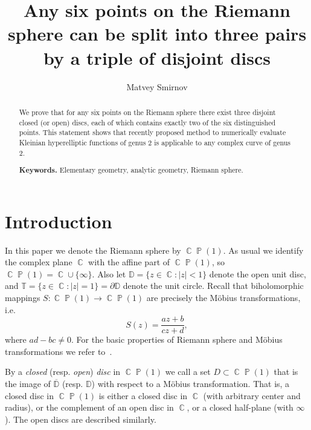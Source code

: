 \documentclass{amsart}
\numberwithin{equation}{section}
\theoremstyle{definition}
\theoremstyle{remark}
\DeclareMathOperator{\CC}{\mathbb C}
\DeclareMathOperator{\PP}{\mathbb P}
\begin{document}
	\title[Six points can be split by a triple of disjoint discs]{Any six points on the Riemann sphere can be split into three pairs by a triple of disjoint discs}
	
	\author{Matvey Smirnov}
	\address{119991 Russia, Moscow GSP-1, ul. Gubkina 8,
		Institute for Numerical Mathematics,
		Russian Academy of Sciences}
	
	
	\begin{abstract}
		We prove that for any six points on the Riemann sphere there exist three disjoint closed (or open) discs, each of which contains exactly two of the six distinguished points. This statement shows that recently proposed method to numerically evaluate Kleinian hyperelliptic functions of genus 2 is applicable to any complex curve of genus 2.
		
		\smallskip
		\noindent \textbf{Keywords.} Elementary geometry, analytic geometry, Riemann sphere.
	\end{abstract}
	\maketitle
	
	\section{Introduction}
	
	In this paper we denote the Riemann sphere by $\CC\PP(1)$. As usual we identify the complex plane $\CC$ with the affine part of $\CC\PP(1)$, so $\CC\PP(1) = \CC\cup \{\infty\}$. Also let $\mathbb D = \{z \in \CC: |z| < 1\}$ denote the open unit disc, and $\mathbb T = \{z \in \CC: |z| = 1\} = \partial \mathbb D$ denote the unit circle. Recall that biholomorphic mappings $S: \CC\PP(1) \to \CC\PP(1)$ are precisely the M\"obius transformations, i.e. 
	\[
		S(z) = \dfrac{az+ b}{cz + d},
	\]
	where $ad - bc \ne 0$. For the basic properties of Riemann sphere and M\"obius transformations we refer to~\cite[Chap.~VI]{Cartan}.
	
	By a {\it{closed}} (resp. {\it{open}}) {\it{disc}} in $\CC\PP(1)$ we call a set $D \subset \CC\PP(1)$ that is the image of $\overline{\mathbb D}$ (resp. $\mathbb D$) with respect to a M\"obius transformation. That is, a closed disc in $\CC\PP(1)$ is either a closed disc in $\CC$ (with arbitrary center and radius), or the complement of an open disc in $\CC$, or a closed half-plane (with $\infty$). The open discs are described similarly.
	
\end{document}
